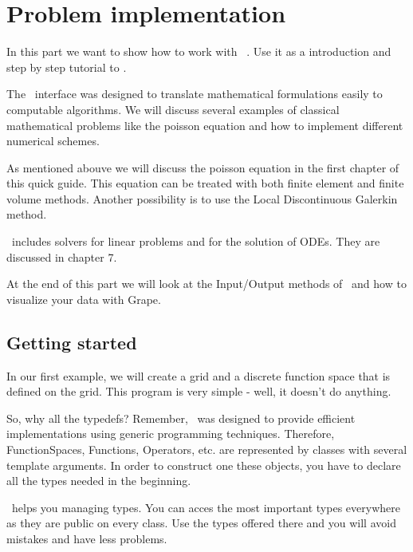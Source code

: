 
\chapter{Problem implementation}


In this part we want to show how to work with \Dune\ \Fem. Use it as a introduction and step by step tutorial to \Fem.

The \Fem\ interface was designed to translate mathematical formulations easily to computable algorithms. We will discuss several examples of classical mathematical problems like the poisson equation and how to implement different numerical schemes. 

As mentioned abouve we will discuss the poisson equation in the first chapter of this quick guide. This equation can be treated with both finite element and finite volume methods. Another possibility is to use the Local Discontinuous Galerkin method.

\Fem\ includes solvers for linear problems and for the solution of ODEs. They are discussed in chapter 7.

At the end of this part we will look at the Input/Output methods of \Fem\ and how to visualize your data with Grape.


\section{Getting started}
  \begin{lst} \mbox{}
    
  \end{lst}
  In our first example, we will create a grid and a discrete function space that is defined on the grid. This program is very simple - well, it doesn't do anything. 

  So, why all the typedefs? Remember, \Dune\ was designed to provide efficient implementations using generic programming techniques. Therefore, FunctionSpaces, Functions, Operators, etc. are represented by classes with several template arguments. In order to construct one these objects, you have to declare all the types needed in the beginning. 

  \Fem\ helps you managing types. You can acces the most important types everywhere as they are public on every class. Use the types offered there and you will avoid mistakes and have less problems.



